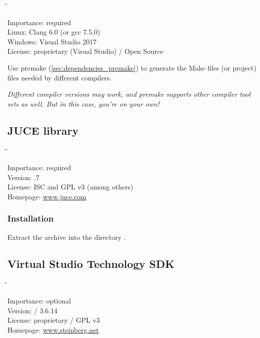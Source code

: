 \begin{tabbing}
  \hspace*{6em}\=\=\kill

  Importance:  \> required \\
  Linux:       \> Clang 6.0 (or gcc 7.5.0) \\
  Windows:     \> Visual Studio 2017 \\
  License:     \> proprietary (Visual Studio) / Open Source \\
\end{tabbing}

Use premake (\ref{sec:dependencies_premake}) to generate the Make
files (or project) files needed by different compilers.

\emph{Different compiler versions may work, and premake supports other
  compiler tool sets as well.  But in this case, you're on your own!}

\subsection{JUCE library}

\begin{tabbing}
  \hspace*{6em}\=\=\kill

  Importance:  \> required \\
  Version:     .7 \\
  License:     \> ISC and GPL v3 (among others) \\
  Homepage:    \> \href{http://www.juce.com/}{www.juce.com}
\end{tabbing}

\subsubsection{Installation}

Extract the archive into the directory .

\subsection{Virtual Studio Technology SDK}

\begin{tabbing}
  \hspace*{6em}\=\=\kill

  Importance:  \> optional \\
  Version:      / 3.6.14 \\
  License:     \> proprietary / GPL v3 \\
  Homepage:    \> \href{http://www.steinberg.net/en/company/developer.html}{www.steinberg.net}
\end{tabbing}

